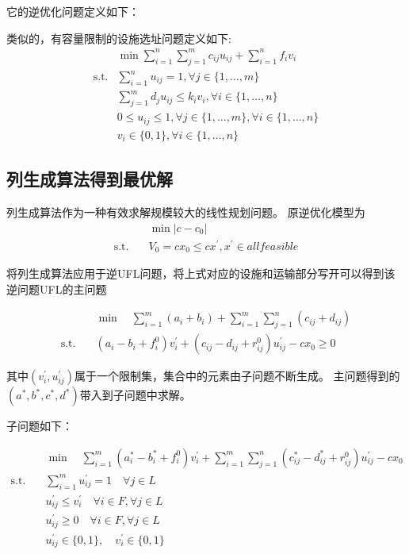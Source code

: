\documentclass[UTF8]{article}
\begin{document}
它的逆优化问题定义如下：



类似的，有容量限制的设施选址问题定义如下:
\begin{align*}
&\min \sum_{i=1}^n \sum_{j=1}^m c_{ij}u_{ij} + \sum_{i=1}^n f_i v_i \\
\text{s.t.}& \sum_{i=1}^n u_{ij} =1, \forall j \in \{1,\ldots,m\}  \\
&\sum_{j=1}^m d_j u_{ij}  \leq k_iv_i, \forall i \in \{1,\ldots,n\} \\
& 0 \leq u_{ij} \leq 1,\forall j \in \{1,\ldots,m\}, \forall i \in \{1,\ldots,n\} \\
& v_{i} \in \{0,1\}, \forall i \in \{1,\ldots,n\}
\end{align*}


\subsection{列生成算法得到最优解}
列生成算法作为一种有效求解规模较大的线性规划问题。
原逆优化模型为
\begin{align*}
&\min |c-c_0|  \\
\text{s.t.}\quad & V_0 = cx_0 \leq cx^{'}, x^{'} \in all feasible
\end{align*}

将列生成算法应用于逆UFL问题，将上式对应的设施和运输部分写开可以得到该逆问题UFL的主问题

\begin{align*}
&\min \quad \sum_{i=1}^m(a_i+b_i)+\sum_{i=1}^m\sum_{j=1}^n(c_{ij}+d_{ij})\\
\text{s.t.}\quad & (a_i-b_i+f_i^0)v_i^{'} + (c_{ij}-d_{ij}+r_{ij}^0)u_{ij}^{'} - cx_0 \geq 0
\end{align*}

其中$(v_i^{'},u_{ij}^{'})$属于一个限制集，集合中的元素由子问题不断生成。
主问题得到的$(a^*,b^*,c^*,d^*)$带入到子问题中求解。

子问题如下：

\begin{align}
&\min \quad \sum_{i=1}^m(a_i^*-b_i^*+f_i^0)v_i^{'}+\sum_{i=1}^m\sum_{j=1}^n(c_{ij}^*-d_{ij}^*+r_{ij}^0)u_{ij}^{'}-cx_0\\
\text{s.t.}\quad & \sum_{i=1}^m u_{ij}^{'} =1 \quad \forall j\in L \\
& u_{ij}^{'} \leq v_{i}^{'} \quad \forall i \in F, \forall j \in L \\
& u_{ij}^{'} \geq 0 \quad \forall i \in F, \forall j \in L \\
&u_{ij}^{'} \in \{0,1\} ,\quad v_{i}^{'} \in \{0,1\}
\end{align}
\end{document}
